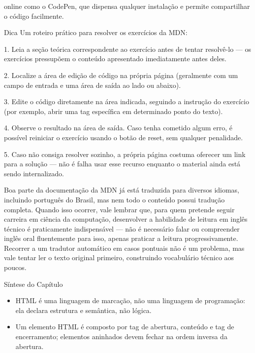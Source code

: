 online como o CodePen, que dispensa qualquer instalação e permite compartilhar o código facilmente.

\begin{infobox}{Dica}
Um roteiro prático para resolver os exercícios da MDN:
\end{infobox}

1. Leia a seção teórica correspondente ao exercício antes de tentar resolvê-lo — os exercícios pressupõem o conteúdo apresentado imediatamente antes deles.

2. Localize a área de edição de código na própria página (geralmente com um campo de entrada e uma área de saída ao lado ou abaixo).

3. Edite o código diretamente na área indicada, seguindo a instrução do exercício (por exemplo, abrir uma tag específica em determinado ponto do texto).

4. Observe o resultado na área de saída. Caso tenha cometido algum erro, é possível reiniciar o exercício usando o botão de reset, sem qualquer penalidade.

5. Caso não consiga resolver sozinho, a própria página costuma oferecer um link para a solução — não é falha usar esse recurso enquanto o material ainda está sendo internalizado.

Boa parte da documentação da MDN já está traduzida para diversos idiomas, incluindo português do Brasil, mas nem todo o conteúdo possui tradução completa. Quando isso ocorrer, vale lembrar que, para quem pretende seguir carreira em ciência da computação, desenvolver a habilidade de leitura em inglês técnico é praticamente indispensável — não é necessário falar ou compreender inglês oral fluentemente para isso, apenas praticar a leitura progressivamente. Recorrer a um tradutor automático em casos pontuais não é um problema, mas vale tentar ler o texto original primeiro, construindo vocabulário técnico aos poucos.

Síntese do Capítulo

\begin{itemize}
  \item HTML é uma linguagem de marcação, não uma linguagem de programação: ela declara estrutura e semântica, não lógica.
\end{itemize}

\begin{itemize}
  \item Um elemento HTML é composto por tag de abertura, conteúdo e tag de encerramento; elementos aninhados devem fechar na ordem inversa da abertura.
\end{itemize}

